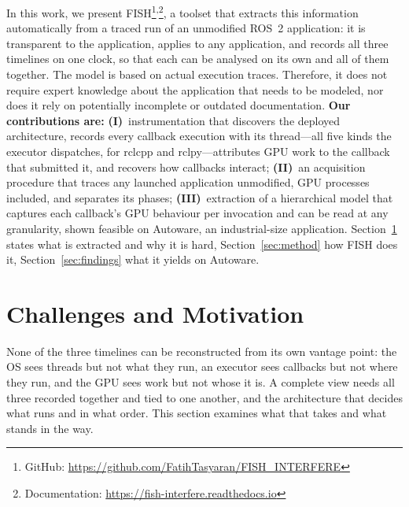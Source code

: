 In this work, we present FISH\footnote{GitHub: \url{https://github.com/FatihTasyaran/FISH_INTERFERE}}\textsuperscript{,}\footnote{Documentation: \url{https://fish-interfere.readthedocs.io}}, a toolset that extracts this information automatically from a traced run of an unmodified ROS~2 application: it is transparent to the application, applies to any application, and records all three timelines on one clock, so that each can be analysed on its own and all of them together. The model is based on actual execution traces. Therefore, it does not require expert knowledge about the application that needs to be modeled, nor does it rely on potentially incomplete or outdated documentation. \textbf{Our contributions are:} \textbf{(I)}~instrumentation that discovers the deployed architecture, records every callback execution with its thread---all five kinds the executor dispatches, for rclcpp and rclpy---attributes GPU work to the callback that submitted it, and recovers how callbacks interact; \textbf{(II)}~an acquisition procedure that traces any launched application unmodified, GPU processes included, and separates its phases; \textbf{(III)}~extraction of a hierarchical model that captures each callback's GPU behaviour per invocation and can be read at any granularity, shown feasible on Autoware, an industrial-size application. Section~\ref{sec:goal} states what is extracted and why it is hard, Section~\ref{sec:method} how FISH does it, Section~\ref{sec:findings} what it yields on Autoware.

\section{Challenges and Motivation}
\label{sec:goal}
None of the three timelines can be reconstructed from its own vantage point: the OS sees threads but not what they run, an executor sees callbacks but not where they run, and the GPU sees work but not whose it is. A complete view needs all three recorded together and tied to one another, and the architecture that decides what runs and in what order. This section examines what that takes and what stands in the way.

